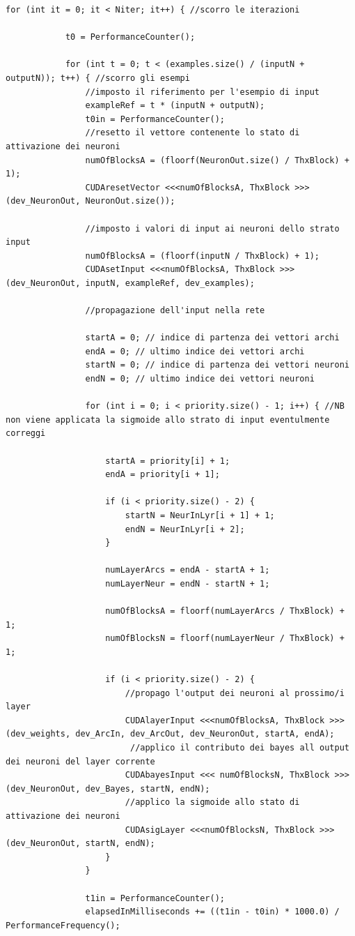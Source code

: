 \documentclass[10pt,a4paper]{article}
\begin{document}
\begin{lstlisting}[style=mycuda, caption= classe di interfaccia alla GPU, captionpos=b]
		for (int it = 0; it < Niter; it++) { //scorro le iterazioni

			t0 = PerformanceCounter();

			for (int t = 0; t < (examples.size() / (inputN + outputN)); t++) { //scorro gli esempi
				//imposto il riferimento per l'esempio di input
				exampleRef = t * (inputN + outputN);
				t0in = PerformanceCounter();
				//resetto il vettore contenente lo stato di attivazione dei neuroni
				numOfBlocksA = (floorf(NeuronOut.size() / ThxBlock) + 1);
				CUDAresetVector <<<numOfBlocksA, ThxBlock >>> (dev_NeuronOut, NeuronOut.size());

				//imposto i valori di input ai neuroni dello strato input
				numOfBlocksA = (floorf(inputN / ThxBlock) + 1);
				CUDAsetInput <<<numOfBlocksA, ThxBlock >>> (dev_NeuronOut, inputN, exampleRef, dev_examples);

				//propagazione dell'input nella rete

				startA = 0; // indice di partenza dei vettori archi
				endA = 0; // ultimo indice dei vettori archi
				startN = 0; // indice di partenza dei vettori neuroni
				endN = 0; // ultimo indice dei vettori neuroni

				for (int i = 0; i < priority.size() - 1; i++) { //NB non viene applicata la sigmoide allo strato di input eventulmente correggi

					startA = priority[i] + 1;
					endA = priority[i + 1];

					if (i < priority.size() - 2) {
						startN = NeurInLyr[i + 1] + 1;
						endN = NeurInLyr[i + 2];
					}

					numLayerArcs = endA - startA + 1;
					numLayerNeur = endN - startN + 1;

					numOfBlocksA = floorf(numLayerArcs / ThxBlock) + 1;
					numOfBlocksN = floorf(numLayerNeur / ThxBlock) + 1;

					if (i < priority.size() - 2) {
						//propago l'output dei neuroni al prossimo/i layer
						CUDAlayerInput <<<numOfBlocksA, ThxBlock >>> (dev_weights, dev_ArcIn, dev_ArcOut, dev_NeuronOut, startA, endA); 
						 //applico il contributo dei bayes all output dei neuroni del layer corrente 
						CUDAbayesInput <<< numOfBlocksN, ThxBlock >>> (dev_NeuronOut, dev_Bayes, startN, endN);
						//applico la sigmoide allo stato di attivazione dei neuroni
						CUDAsigLayer <<<numOfBlocksN, ThxBlock >>> (dev_NeuronOut, startN, endN); 
					}
				}

				t1in = PerformanceCounter();
				elapsedInMilliseconds += ((t1in - t0in) * 1000.0) / PerformanceFrequency();



\end{lstlisting}
\end{document}
